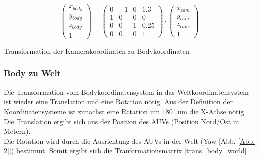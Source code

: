 \begin{ownequation}[H]
\begin{equation}
\begin{pmatrix}
x_{body}\\y_{body}\\z_{body}\\1
\end{pmatrix}
=
\begin{pmatrix}
0 & -1 & 0& 1.3\\
1 & 0 & 0& 0\\
0 & 0 & 1& 0.25\\
0 & 0 & 0 & 1
\end{pmatrix}
\cdot
\begin{pmatrix}
x_{cam}\\y_{cam}\\z_{cam}\\1
\end{pmatrix}
\end{equation}
\caption{Transformation der Kamerakoordinaten zu Bodykoordinaten}
\label{trans_cam_body}
\end{ownequation}

\subsubsection{Body zu Welt}
Die Transformation vom Bodykoordinatensystem in das Weltkoordinatensystem ist wieder eine Translation und eine Rotation nötig.
Aus der Definition der Koordinatensysteme ist zunächst eine Rotation um $180^\circ$ um die X-Achse nötig.
Die Translation ergibt sich aus der Position des AUVs (Position Nord/Ost in Metern).\\
Die Rotation wird durch die Ausrichtung des AUVs in der Welt (Yaw [Abb. \ref{Abb. 2}]) bestimmt. Somit ergibt sich die Tranformationsmatrix \ref{trans_body_world}\\


